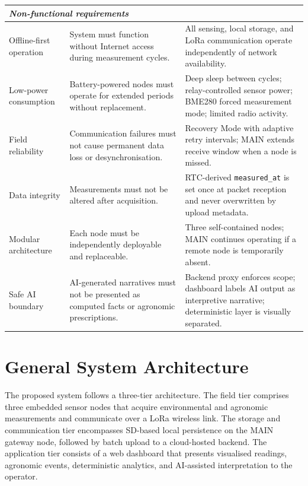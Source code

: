 \begin{table}[H]
\begin{tabular}{p{2.8cm} p{6.2cm} p{5.0cm}}
\hline
\multicolumn{3}{l}{\textit{Non-functional requirements}} \\
\hline
Offline-first operation & System must function without Internet access during measurement cycles. & All sensing, local storage, and LoRa communication operate independently of network availability. \\
\hline
Low-power consumption & Battery-powered nodes must operate for extended periods without replacement. & Deep sleep between cycles; relay-controlled sensor power; BME280 forced measurement mode; limited radio activity. \\
\hline
Field reliability & Communication failures must not cause permanent data loss or desynchronisation. & Recovery Mode with adaptive retry intervals; MAIN extends receive window when a node is missed. \\
\hline
Data integrity & Measurements must not be altered after acquisition. & RTC-derived \texttt{measured\_at} is set once at packet reception and never overwritten by upload metadata. \\
\hline
Modular architecture & Each node must be independently deployable and replaceable. & Three self-contained nodes; MAIN continues operating if a remote node is temporarily absent. \\
\hline
Safe AI boundary & AI-generated narratives must not be presented as computed facts or agronomic prescriptions. & Backend proxy enforces scope; dashboard labels AI output as interpretive narrative; deterministic layer is visually separated. \\
\hline
\end{tabular}
\end{table}

\section{General System Architecture}
\label{sec:architecture}

The proposed system follows a three-tier architecture. The field tier comprises three embedded sensor nodes that acquire environmental and agronomic measurements and communicate over a LoRa wireless link. The storage and communication tier encompasses SD-based local persistence on the MAIN gateway node, followed by batch upload to a cloud-hosted backend. The application tier consists of a web dashboard that presents visualised readings, agronomic events, deterministic analytics, and AI-assisted interpretation to the operator.

